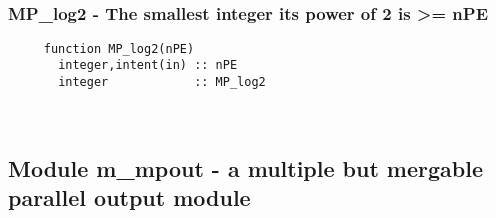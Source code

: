  
\mbox{}\hrulefill\ 
 
  \subsubsection{MP\_log2 - The smallest integer its power of 2 is >= nPE}

\begin{verbatim} 
     function MP_log2(nPE)
       integer,intent(in) :: nPE
       integer            :: MP_log2
 \end{verbatim}%


 
 
\mbox{}\hrulefill\ 
 
  \subsection{Module m\_mpout - a multiple but mergable parallel output module }

